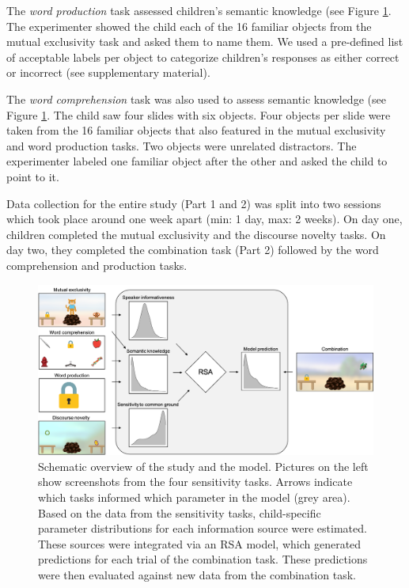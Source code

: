 \documentclass[
  man,floatsintext]{apa6}
\begin{document}
The \emph{word production} task assessed children's semantic knowledge (see Figure \ref{fig:fig1}. The experimenter showed the child each of the 16 familiar objects from the mutual exclusivity task and asked them to name them. We used a pre-defined list of acceptable labels per object to categorize children's responses as either correct or incorrect (see supplementary material).

The \emph{word comprehension} task was also used to assess semantic knowledge (see Figure \ref{fig:fig1}. The child saw four slides with six objects. Four objects per slide were taken from the 16 familiar objects that also featured in the mutual exclusivity and word production tasks. Two objects were unrelated distractors. The experimenter labeled one familiar object after the other and asked the child to point to it.

Data collection for the entire study (Part 1 and 2) was split into two sessions which took place around one week apart (min: 1 day, max: 2 weeks). On day one, children completed the mutual exclusivity and the discourse novelty tasks. On day two, they completed the combination task (Part 2) followed by the word comprehension and production tasks.

\begin{figure}
\includegraphics[width=1\linewidth]{./figures/fig1} \caption{Schematic overview of the study and the model. Pictures on the left show screenshots from the four sensitivity tasks. Arrows indicate which tasks informed which parameter in the model (grey area). Based on the data from the sensitivity tasks, child-specific parameter distributions for each information source were estimated. These sources were integrated via an RSA model, which generated predictions for each trial of the combination task. These predictions were then evaluated against new data from the combination task.}\label{fig:fig1}
\end{figure}
\end{document}
